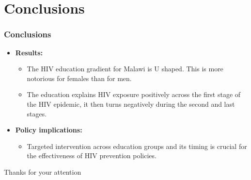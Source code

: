 \documentclass{beamer}
\begin{document}
\section{Conclusions}
\begin{frame}
\frametitle{Conclusions}
\begin{itemize}
   		\item \textbf{Results:}
  		 \begin{itemize}
         \item The HIV education gradient for Malawi is U shaped. This is more notorious for females than for men.
  			 \item The education explains HIV exposure positively across the first stage of the HIV epidemic, it then turns negatively during the second and last stages.
   		\end{itemize}
        \item \textbf{Policy implications:}
  		 \begin{itemize}
  			 \item Targeted intervention across education groups and its timing is crucial for the effectiveness of HIV prevention policies.
   		\end{itemize}
    
   		
    
  \end{itemize}
\Huge{\centerline{Thanks for your attention}}
\end{frame}
\end{document}
